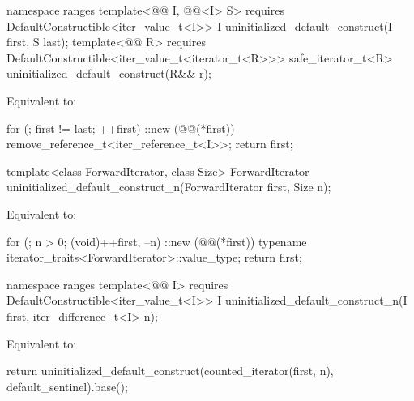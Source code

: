 %
\begin{itemdecl}
namespace ranges {
  template<@@ I, @@<I> S>
      requires DefaultConstructible<iter_value_t<I>>
    I uninitialized_default_construct(I first, S last);
  template<@@ R>
      requires DefaultConstructible<iter_value_t<iterator_t<R>>>
    safe_iterator_t<R> uninitialized_default_construct(R&& r);
}
\end{itemdecl}

\begin{itemdescr}
\pnum
\effects Equivalent to:
\begin{codeblock}
for (; first != last; ++first)
  ::new (@@(*first)) remove_reference_t<iter_reference_t<I>>;
return first;
\end{codeblock}
\end{itemdescr}

%
\begin{itemdecl}
template<class ForwardIterator, class Size>
  ForwardIterator uninitialized_default_construct_n(ForwardIterator first, Size n);
\end{itemdecl}

\begin{itemdescr}
\pnum
\effects
Equivalent to:
\begin{codeblock}
for (; n > 0; (void)++first, --n)
  ::new (@@(*first))
    typename iterator_traits<ForwardIterator>::value_type;
return first;
\end{codeblock}
\end{itemdescr}

%
\begin{itemdecl}
namespace ranges {
  template<@@ I>
      requires DefaultConstructible<iter_value_t<I>>
    I uninitialized_default_construct_n(I first, iter_difference_t<I> n);
}
\end{itemdecl}

\begin{itemdescr}
\pnum
\effects Equivalent to:
\begin{codeblock}
return uninitialized_default_construct(counted_iterator(first, n),
                                       default_sentinel).base();
\end{codeblock}
\end{itemdescr}

